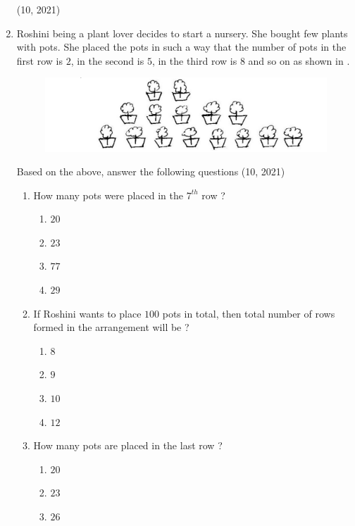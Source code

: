 \begin{enumerate}[label=\thesubsection.\arabic*,ref=\thesubsection.\theenumi,itemsep=1pt]
%
	\hfill (10, 2021) \item
	Roshini being a plant lover decides to start a nursery. She bought few plants with pots. She placed the pots in such a way that the number of pots in the first row is $2$, in the second is $5$, in the third row is $8$ and so on as shown in 
			.
		\begin{figure}[H]
			\centering	
			\includegraphics[width=\columnwidth]{figs/ap/Plant.png}
			\caption{}
			\label{fig:Plants}
		\end{figure}
		Based on the above, answer the following questions 
\hfill (10, 2021)
		\begin{enumerate}
\item How many pots were placed in the $7^{th}$ row ?
				\begin{multicols}{4}
\begin{enumerate}    
					 \item $20$
					 \item $23$
					 \item $77$
					 \item $29$
				\end{enumerate}
\end{multicols}
 \item If Roshini wants to place $100$ pots in total, then total number of rows formed in the arrangement will be ?
				\begin{multicols}{4}
\begin{enumerate}    
					 \item $8$
					 \item $9$
					 \item $10$
					 \item $12$
				\end{enumerate}
\end{multicols}
 \item How many pots are placed in the last row ?
				\begin{multicols}{4}
\begin{enumerate}    
					 \item $20$
					 \item $23$
					 \item $26$

\end{enumerate}
\end{multicols}
\end{enumerate}
\end{enumerate}
